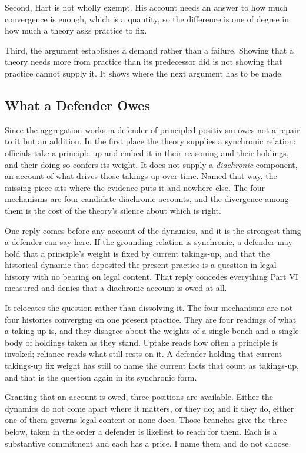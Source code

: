 Second, Hart is not wholly exempt. His account needs an answer to how much
convergence is enough, which is a quantity, so the difference is one of degree
in how much a theory asks practice to fix.

Third, the argument establishes a demand rather than a failure. Showing that a
theory needs more from practice than its predecessor did is not showing that
practice cannot supply it. It shows where the next argument has to be made.

\subsection{What a Defender Owes}

Since the aggregation works, a defender of principled positivism owes not a
repair to it but an addition. In the first place the theory
supplies a synchronic relation: officials take a principle up and embed it in their
reasoning and their holdings, and their doing so confers its weight. It does
not supply a \textit{diachronic} component, an account of what drives those
takings-up over time. Named that way, the missing piece
sits where the evidence puts it and nowhere else. The four mechanisms are four candidate diachronic accounts, and the
divergence among them is the cost of the theory's silence about which is
right.

One reply comes before any account of the dynamics, and it is the strongest
thing a defender can say here. If the grounding relation is synchronic, a
defender may hold that a principle's weight is fixed by current takings-up,
and that the historical dynamic that deposited the present practice is a
question in legal history with no bearing on legal content. That reply
concedes everything Part VI measured and denies that a diachronic account is
owed at all.

It relocates the question rather than dissolving it. The four mechanisms are
not four histories converging on one present practice. They are four readings
of what a taking-up is, and they disagree about the weights of a single bench
and a single body of holdings taken as they stand. Uptake reads how often a
principle is invoked; reliance reads what still rests on it. A defender holding that
current takings-up fix weight has still to name the current facts that count
as takings-up, and that is the question again in its synchronic form.

Granting that an account is owed, three positions are available. Either the
dynamics do not come apart where it matters, or they do; and if they do,
either one of them governs legal content or none does. Those branches give the
three below, taken in the order a defender is likeliest to reach for them.
Each is a substantive commitment and each has a price. I name them and do not
choose.

